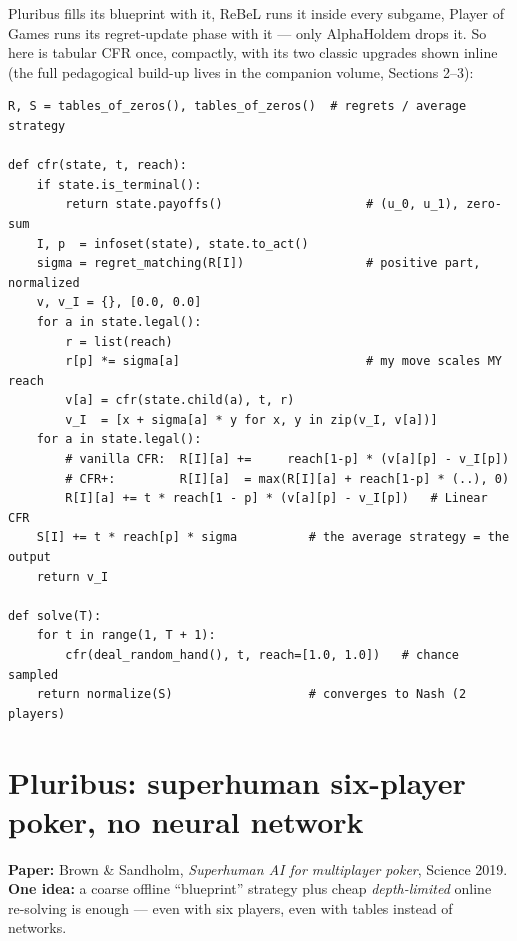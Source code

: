 \documentclass[11pt,a4paper]{article}
\begin{document}
Pluribus fills its blueprint with it, ReBeL runs it inside every subgame,
Player of Games runs its regret-update phase with it --- only AlphaHoldem
drops it. So here is tabular CFR once, compactly, with its two classic
upgrades shown inline (the full pedagogical build-up lives in the companion
volume, Sections 2--3):

\begin{lstlisting}[style=py, caption={CFR in one block. \texttt{reach[p]} is the probability that player $p$'s own choices lead here; regrets are weighted by the \emph{opponent's} reach, the average strategy by \emph{your own}. The commented lines show the vanilla / CFR$^{+}$ variants of the update; the active lines are Linear CFR (weight everything by $t$), which is what Pluribus and Deep CFR use.}]
R, S = tables_of_zeros(), tables_of_zeros()  # regrets / average strategy

def cfr(state, t, reach):
    if state.is_terminal():
        return state.payoffs()                    # (u_0, u_1), zero-sum
    I, p  = infoset(state), state.to_act()
    sigma = regret_matching(R[I])                 # positive part, normalized
    v, v_I = {}, [0.0, 0.0]
    for a in state.legal():
        r = list(reach)
        r[p] *= sigma[a]                          # my move scales MY reach
        v[a] = cfr(state.child(a), t, r)
        v_I  = [x + sigma[a] * y for x, y in zip(v_I, v[a])]
    for a in state.legal():
        # vanilla CFR:  R[I][a] +=     reach[1-p] * (v[a][p] - v_I[p])
        # CFR+:         R[I][a]  = max(R[I][a] + reach[1-p] * (..), 0)
        R[I][a] += t * reach[1 - p] * (v[a][p] - v_I[p])   # Linear CFR
    S[I] += t * reach[p] * sigma          # the average strategy = the output
    return v_I

def solve(T):
    for t in range(1, T + 1):
        cfr(deal_random_hand(), t, reach=[1.0, 1.0])   # chance sampled
    return normalize(S)                   # converges to Nash (2 players)
\end{lstlisting}

\section{Pluribus: superhuman six-player poker, no neural network}

\textbf{Paper:} Brown \& Sandholm, \emph{Superhuman AI for multiplayer poker},
Science 2019. \quad
\textbf{One idea:} a coarse offline ``blueprint'' strategy plus cheap
\emph{depth-limited} online re-solving is enough --- even with six players,
even with tables instead of networks.
\end{document}
